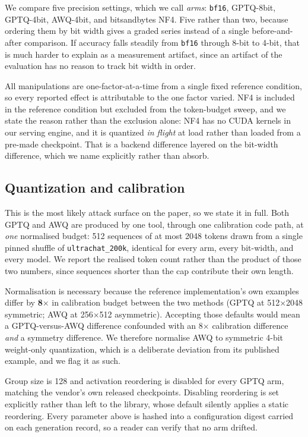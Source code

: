 \documentclass[conference]{IEEEtran}
\begin{document}
We compare five precision settings, which we call \emph{arms}: \texttt{bf16},
GPTQ-8bit, GPTQ-4bit, AWQ-4bit, and bitsandbytes NF4. Five rather than two, because
ordering them by bit width gives a graded series instead of a single before-and-after
comparison. If accuracy falls steadily from \texttt{bf16} through 8-bit to 4-bit,
that is much harder to explain as a measurement artifact, since an artifact of the
evaluation has no reason to track bit width in order.

All manipulations are one-factor-at-a-time from a single fixed reference
condition, so every reported effect is attributable to the one factor varied.
NF4 is included in the reference condition but excluded from the token-budget
sweep, and we state the reason rather than the exclusion alone: NF4 has no CUDA
kernels in our serving engine, and it is quantized \emph{in flight} at load
rather than loaded from a pre-made checkpoint. That is a backend difference
layered on the bit-width difference, which we name explicitly rather than absorb.

\subsection{Quantization and calibration}
\label{sec:quant}
This is the most likely attack surface on the paper, so we state it in full.
Both GPTQ and AWQ are produced by one tool, through one calibration code path,
at \emph{one} normalised budget: 512 sequences of at most 2048 tokens drawn from
a single pinned shuffle of \texttt{ultrachat\_200k}, identical for every arm,
every bit-width, and every model. We report the realised token count rather than
the product of those two numbers, since sequences shorter than the cap
contribute their own length.

Normalisation is necessary because the reference implementation's own examples
differ by \textbf{8$\times$} in calibration budget between the two methods
(GPTQ at 512$\times$2048 symmetric; AWQ at 256$\times$512 asymmetric). Accepting
those defaults would mean a GPTQ-versus-AWQ difference confounded with an
8$\times$ calibration difference \emph{and} a symmetry difference. We therefore
normalise AWQ to symmetric 4-bit weight-only quantization, which is a deliberate
deviation from its published example, and we flag it as such.

Group size is 128 and activation reordering is disabled for every GPTQ arm,
matching the vendor's own released checkpoints. Disabling reordering is set
explicitly rather than left to the library, whose default silently applies a
static reordering. Every parameter above is hashed into a configuration digest
carried on each generation record, so a reader can verify that no arm drifted.
\end{document}
